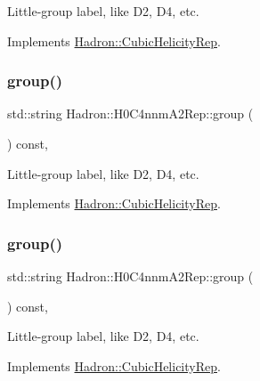 Little-\/group label, like D2, D4, etc. 

Implements \mbox{\hyperlink{structHadron_1_1CubicHelicityRep_a101a7d76cd8ccdad0f272db44b766113}{Hadron\+::\+Cubic\+Helicity\+Rep}}.

\mbox{\label{structHadron_1_1H0C4nnmA2Rep_a04d0d1b6a859d992423de875ce86f980}} 
\subsubsection{\texorpdfstring{group()}{group()}\hspace{0.1cm}{\footnotesize\ttfamily [2/3]}}
{\footnotesize\ttfamily std\+::string Hadron\+::\+H0\+C4nnm\+A2\+Rep\+::group (\begin{DoxyParamCaption}{ }\end{DoxyParamCaption}) const\hspace{0.3cm}{\ttfamily [inline]}, {\ttfamily [virtual]}}

Little-\/group label, like D2, D4, etc. 

Implements \mbox{\hyperlink{structHadron_1_1CubicHelicityRep_a101a7d76cd8ccdad0f272db44b766113}{Hadron\+::\+Cubic\+Helicity\+Rep}}.

\mbox{\label{structHadron_1_1H0C4nnmA2Rep_a04d0d1b6a859d992423de875ce86f980}} 
\subsubsection{\texorpdfstring{group()}{group()}\hspace{0.1cm}{\footnotesize\ttfamily [3/3]}}
{\footnotesize\ttfamily std\+::string Hadron\+::\+H0\+C4nnm\+A2\+Rep\+::group (\begin{DoxyParamCaption}{ }\end{DoxyParamCaption}) const\hspace{0.3cm}{\ttfamily [inline]}, {\ttfamily [virtual]}}

Little-\/group label, like D2, D4, etc. 

Implements \mbox{\hyperlink{structHadron_1_1CubicHelicityRep_a101a7d76cd8ccdad0f272db44b766113}{Hadron\+::\+Cubic\+Helicity\+Rep}}.

